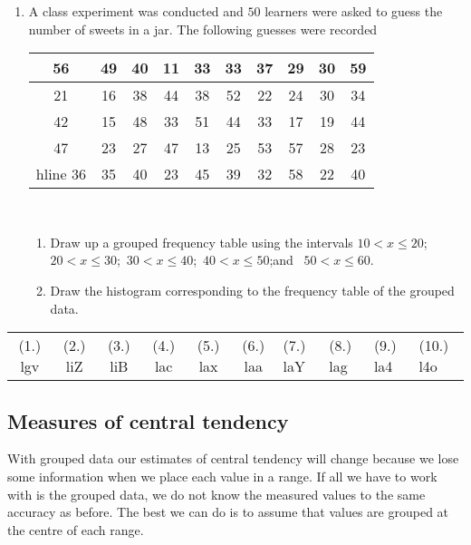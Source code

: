 \begin{exercises}{}{
  \begin{enumerate}[itemsep=5pt, label=\textbf{\arabic*}. ]
 \item  A class experiment was conducted and $50$ learners were asked to
  guess the number of sweets in a jar. The following guesses were
  recorded
\\
  \begin{center}
    \begin{tabular}{|c|c|c|c|c|c|c|c|c|c|} \hline
   
      56 & 49 & 40 & 11 & 33 & 33 & 37 & 29 & 30 & 59 \\ \hline
      21 & 16 & 38 & 44 & 38 & 52 & 22 & 24 & 30 & 34 \\\hline
      42 & 15 & 48 & 33 & 51 & 44 & 33 & 17 & 19 & 44 \\\hline
      47 & 23 & 27 & 47 & 13 & 25 & 53 & 57 & 28 & 23 \\\4hline
      36 & 35 & 40 & 23 & 45 & 39 & 32 & 58 & 22 & 40 \\\hline

    \end{tabular}
  \end{center}
\vspace {8pt}\\
   \begin{enumerate}[noitemsep, label=\textbf{(\alph*)} ]
\item
 Draw up a grouped frequency table using the intervals
  $10 < x \le 20$;\ $20 < x \le 30$;\ $30 < x \le 40$;\ 
  $40 < x \le 50$;and \ $50 < x \le 60$.

  \item Draw the histogram corresponding to the frequency table of the
  grouped data.
\end{enumerate}
\end{enumerate}
\practiceinfo
\par 
\par \begin{tabular}[h]{cccccc}
(1.) lgv  &  (2.) liZ  &  (3.) liB  &  (4.) lac  &  (5.) lax  &  (6.) laa  &  (7.) laY  &  (8.) lag  &  (9.) la4  &  (10.) l4o  & \end{tabular}
}
\end{exercises}
\subsection*{Measures of central tendency}
With grouped data our estimates of central tendency will change
because we lose some information when we place each value in a range.
If all we have to work with is the grouped data, we do not know the
measured values to the same accuracy as before. The best we can do is
to assume that values are grouped at the centre of each range.\par

